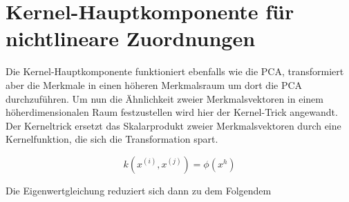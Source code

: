 \documentclass[11pt]{article} %
\begin{document}
\section{Kernel-Hauptkomponente für nichtlineare Zuordnungen}
Die Kernel-Hauptkomponente funktioniert ebenfalls wie die PCA, transformiert aber die Merkmale in einen höheren Merkmalsraum um dort die PCA durchzuführen. Um nun die Ähnlichkeit zweier Merkmalsvektoren in einem höherdimensionalen Raum festzustellen wird hier der Kernel-Trick angewandt. \\
Der Kerneltrick ersetzt das Skalarprodukt zweier Merkmalsvektoren durch eine Kernelfunktion, die sich die Transformation spart.

\begin{equation}
k(x^{(i)}, x^{(j)}) = \phi(x^{h})
\end{equation} 

Die Eigenwertgleichung reduziert sich dann zu dem Folgendem 

 
\end{document}
